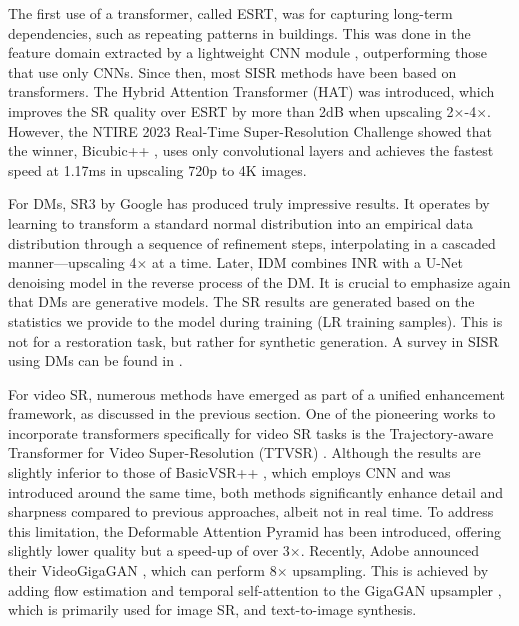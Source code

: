 \documentclass[11pt,a4paper]{article}
\begin{document}
The first use of a transformer, called ESRT, was for capturing long-term dependencies, such as repeating patterns in buildings. This was done in the feature domain extracted by a lightweight CNN module \cite{Lu:Transformer:2022}, outperforming those that use only CNNs. Since then, most SISR methods have been based on transformers. The Hybrid Attention Transformer (HAT) \cite{Chen:Activating:2023} was introduced, which improves the SR quality over ESRT by more than 2dB when upscaling 2$\times$-4$\times$. However, the NTIRE 2023 Real-Time Super-Resolution Challenge \cite{Conde:Efficient:2023} showed that the winner, Bicubic++ \cite{Bilecen:Bicubic:2023}, uses only convolutional layers and achieves the fastest speed at 1.17ms in upscaling 720p to 4K images.

For DMs, SR3 by Google \cite{Saharia:image:2023} has produced truly impressive results. It operates by learning to transform a standard normal distribution into an empirical data distribution through a sequence of refinement steps, interpolating in a cascaded manner—upscaling 4$\times$ at a time. Later, IDM \cite{Gao:Implicit:2023} combines INR with a U-Net denoising model in the reverse process of the DM. It is crucial to emphasize again that DMs are generative models. The SR results are generated based on the statistics we provide to the model during training (LR training samples). This is not for a restoration task, but rather for synthetic generation. A survey in SISR using DMs can be found in \cite{moser:diffusion:2023}.

For video SR, numerous methods have emerged as part of a unified enhancement framework, as discussed in the previous section. One of the pioneering works to incorporate transformers specifically for video SR tasks is the Trajectory-aware Transformer for Video Super-Resolution (TTVSR) \cite{Liu:Learning:2022}. Although the results are slightly inferior to those of BasicVSR++ \cite{Chan:BasicVSR:2022}, which employs CNN and was introduced around the same time, both methods significantly enhance detail and sharpness compared to previous approaches, albeit not in real time. To address this limitation, the Deformable Attention Pyramid \cite{Fuoli:Fast:2023} has been introduced, offering slightly lower quality but a speed-up of over 3$\times$. Recently, Adobe announced their VideoGigaGAN \cite{xu:videogigagan:2024}, which can perform 8$\times$ upsampling. This is achieved by adding flow estimation and temporal self-attention to the GigaGAN upsampler \cite{kang:gigagan:2023}, which is primarily used for image SR, and text-to-image synthesis.
\end{document}
